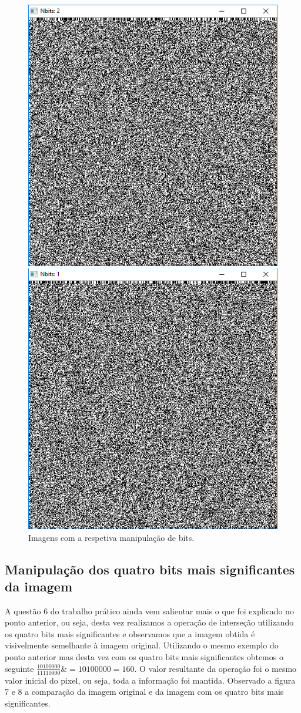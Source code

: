 \documentclass[12pt,a4paper]{article}
\begin{document}
\begin{figure}[h]
\begin{minipage}{0.4\linewidth}
  \end{minipage} 
  \begin{minipage}{0.4\linewidth}
    \centering
    \includegraphics[width=.6\linewidth]{2} 
  \end{minipage} 
  \begin{minipage}{0.4\linewidth}
    \centering
    \includegraphics[width=.6\linewidth]{0} 
  \end{minipage}
  \caption{Imagens com a respetiva manipulação de bits.}
\end{figure}
\subsection{Manipulação dos quatro bits mais significantes da imagem}
A questão 6 do trabalho prático ainda vem salientar mais o que foi explicado no ponto anterior, ou seja, desta vez realizamos a operação de interseção utilizando os quatro bits mais significantes e observamos que a imagem obtida é visivelmente semelhante à imagem original. Utilizando o mesmo exemplo do ponto anterior mas desta vez com os quatro bits mais significantes obtemos o seguinte $\frac{10100000}{11110000}\& = 10100000 = 160$. O valor resultante da operação foi o mesmo valor inicial do pixel, ou seja, toda a informação foi mantida. Observado a  figura 7 e 8 a comparação da imagem original e da imagem com os quatro bits mais significantes.
\end{document}
